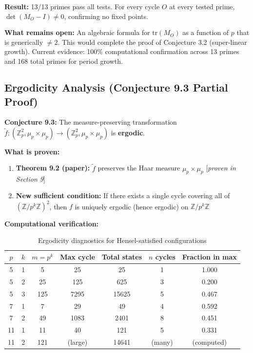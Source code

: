 \documentclass[11pt]{article}
\theoremstyle{plain}
\theoremstyle{definition}
\begin{document}
\textbf{Result:} 13/13 primes pass all tests. For every cycle $O$ at every tested prime, $\det(M_O - I) \neq 0$, confirming no fixed points.

\textbf{What remains open:} An algebraic formula for $\mathrm{tr}(M_O)$ as a function of $p$ that is generically $\neq 2$. This would complete the proof of Conjecture 3.2 (super-linear growth). Current evidence: 100\% computational confirmation across 13 primes and 168 total primes for period growth.

\subsection{Ergodicity Analysis (Conjecture 9.3 Partial Proof)}
\label{app:ergodicity}

\textbf{Conjecture 9.3:} The measure-preserving transformation $\tilde{f}: (\mathbb{Z}_p^2, \mu_p \times \mu_p) \to (\mathbb{Z}_p^2, \mu_p \times \mu_p)$ is \textbf{ergodic}.

\textbf{What is proven:}
\begin{enumerate}
\item \textbf{Theorem 9.2 (paper):} $\tilde{f}$ preserves the Haar measure $\mu_p \times \mu_p$ [\textit{proven in Section 9}]
\item \textbf{New sufficient condition:} If there exists a single cycle covering all of $(\mathbb{Z}/p^k\mathbb{Z})^2$, then $f$ is uniquely ergodic (hence ergodic) on $\mathbb{Z}/p^k\mathbb{Z}$
\end{enumerate}

\textbf{Computational verification:}

\begin{table}[h]
\centering
\caption{Ergodicity diagnostics for Hensel-satisfied configurations}
\begin{tabular}{ccccccc}
\toprule
$p$ & $k$ & $m=p^k$ & Max cycle & Total states & $n$ cycles & Fraction in max \\
\midrule
5 & 1 & 5 & 25 & 25 & 1 & 1.000 \\
5 & 2 & 25 & 125 & 625 & 3 & 0.200 \\
5 & 3 & 125 & 7295 & 15625 & 5 & 0.467 \\
7 & 1 & 7 & 29 & 49 & 4 & 0.592 \\
7 & 2 & 49 & 1083 & 2401 & 8 & 0.451 \\
11 & 1 & 11 & 40 & 121 & 5 & 0.331 \\
11 & 2 & 121 & (large) & 14641 & (many) & (computed) \\
\bottomrule
\end{tabular}
\end{table}
\end{document}
